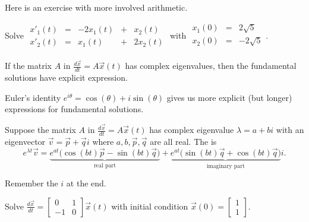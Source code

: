 \documentclass[../main.tex]{subfiles}
\begin{document}
\clearpage
Here is an exercise with more involved arithmetic.
\begin{example}
  Solve 
  \(
  \begin{array}{rcrcr}
    x'_{1}(t) &=& -2 x_{1}(t) &+&  x_{2}(t) \\
    x'_{2}(t) &=&    x_{1}(t) &+& 2x_{2}(t)
  \end{array}
  \) with \(
  \begin{array}{rcr}
    x_{1}(0) &=&  2 \sqrt{5} \\
    x_{2}(0) &=& -2 \sqrt{5} \\
  \end{array}
  \).
\end{example}

If the matrix \(A\) in \(\frac{d\vec{x}}{dt} = A \vec{x}(t)\) has complex eigenvalues, then the fundamental solutions have explicit expression. 

\begin{definition}
  Euler's identity \(e^{i \theta} = \cos(\theta) + i \sin(\theta)\) gives us more explicit (but longer) expressions for fundamental solutions. 

  Suppose the matrix \(A\) in \(\frac{d\vec{x}}{dt} = A \vec{x}(t)\) has complex eigenvalue \(\lambda = a + bi\) with an eigenvector \(\vec{v} = \vec{p} + \vec{q}i\) where \(a,b,\vec{p},\vec{q}\) are all real. The  is
  \[
    e^{\lambda t} \vec{v} = \underbrace{e^{at} \bigg( \cos(bt) \vec{p} - \sin(bt) \vec{q} \bigg)}_{\text{real part}} +  \underbrace{e^{at} \bigg( \sin(bt) \vec{q} + \cos(bt) \vec{q}\bigg)}_{\text{imaginary part}} i.
  \]

  Remember the \(i\) at the end.
\end{definition}

\begin{example}
  Solve \(\frac{d\vec{x}}{dt} = \begin{bmatrix} 0 & 1 \\ -1 & 0 \end{bmatrix}\vec{x}(t)\) with initial condition \(\vec{x}(0) = \begin{bmatrix} 1 \\ 1 \end{bmatrix}\).
\end{example}
\end{document}
